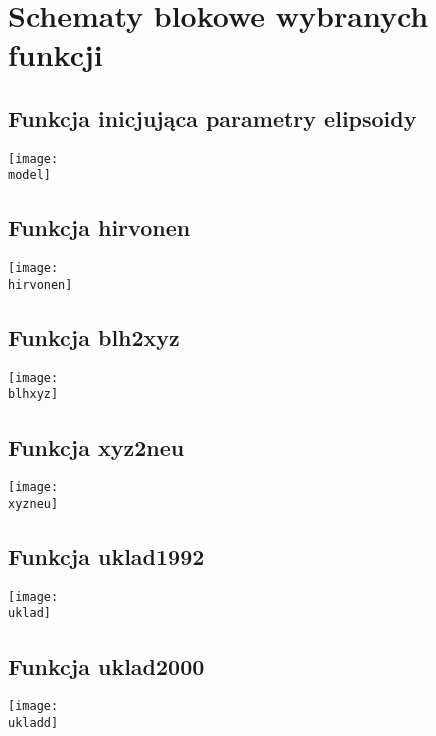 \documentclass[10pt,a4paper]{article}
\begin{document}
	\section{Schematy blokowe wybranych funkcji}
	\subsection{Funkcja inicjująca parametry elipsoidy}
	\begin{center}
		\newcommand{\model}{settings/model.png}
		\texttt{[image: \\model]}
	\end{center}
	\newpage
	
	\subsection{Funkcja hirvonen}
	\begin{center}
		\newcommand{\hirvonen}{settings/hirvonen.png}
		\texttt{[image: \\hirvonen]}
	\end{center}
	\newpage
	
	\subsection{Funkcja blh2xyz}
	\begin{center}
		\newcommand{\blhxyz}{settings/blh2xyz.png}
		\texttt{[image: \\blhxyz]}
	\end{center}
	\newpage
	
	\subsection{Funkcja xyz2neu}
	\begin{center}
		\newcommand{\xyzneu}{settings/xyz2neu.png}
		\texttt{[image: \\xyzneu]}
	\end{center}
	
	\subsection{Funkcja uklad1992}
	\begin{center}
		\newcommand{\uklad}{settings/uklad1992.png}
		\texttt{[image: \\uklad]}
	\end{center}

	\subsection{Funkcja uklad2000}
	\begin{center}
		\newcommand{\ukladd}{settings/uklad2000.png}
		\texttt{[image: \\ukladd]}
	\end{center}
	
\end{document}
